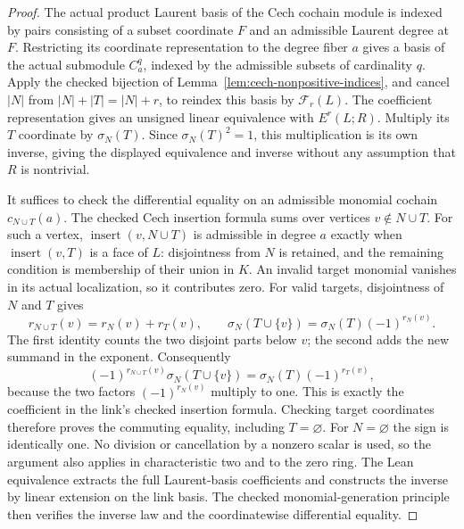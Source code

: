 \begin{proof}
\leanok
The actual product Laurent basis of the Cech cochain module is indexed
by pairs consisting of a subset coordinate $F$ and an admissible Laurent
degree at $F$. Restricting its coordinate representation to the degree
fiber $a$ gives a basis of the actual submodule $C^q_a$, indexed by the
admissible subsets of cardinality $q$. Apply the checked bijection of
Lemma~\ref{lem:cech-nonpositive-indices}, and cancel $|N|$ from
$|N|+|T|=|N|+r$, to reindex this basis by $\mathcal F_r(L)$.
The coefficient representation gives an unsigned linear equivalence
with $E^r(L;R)$. Multiply its $T$ coordinate by $\sigma_N(T)$.
Since $\sigma_N(T)^2=1$, this multiplication is its own inverse,
giving the displayed equivalence and inverse without any assumption
that $R$ is nontrivial.

It suffices to check the differential equality on an admissible
monomial cochain $c_{N\cup T}(a)$. The checked Cech insertion formula
sums over vertices $v\notin N\cup T$. For such a vertex,
$\operatorname{insert}(v,N\cup T)$ is admissible in degree $a$ exactly
when $\operatorname{insert}(v,T)$ is a face of $L$: disjointness from
$N$ is retained, and the remaining condition is membership of their
union in $K$. An invalid target monomial vanishes in its actual
localization, so it contributes zero. For valid targets, disjointness
of $N$ and $T$ gives
\[
 r_{N\cup T}(v)=r_N(v)+r_T(v),\qquad
 \sigma_N(T\cup\{v\})=\sigma_N(T)(-1)^{r_N(v)}.
\]
The first identity counts the two disjoint parts below $v$; the second
adds the new summand in the exponent. Consequently
\[
 (-1)^{r_{N\cup T}(v)}\sigma_N(T\cup\{v\})
       =\sigma_N(T)(-1)^{r_T(v)},
\]
because the two factors $(-1)^{r_N(v)}$ multiply to one. This is exactly
the coefficient in the link's checked insertion formula. Checking
target coordinates therefore proves the commuting equality, including
$T=\varnothing$. For $N=\varnothing$ the sign is identically one.
No division or cancellation by a nonzero scalar is used, so the argument
also applies in characteristic two and to the zero ring.
The Lean equivalence extracts the full Laurent-basis coefficients and
constructs the inverse by linear extension on the link basis. The checked
monomial-generation principle then verifies the inverse law and the
coordinatewise differential equality.
\end{proof}

